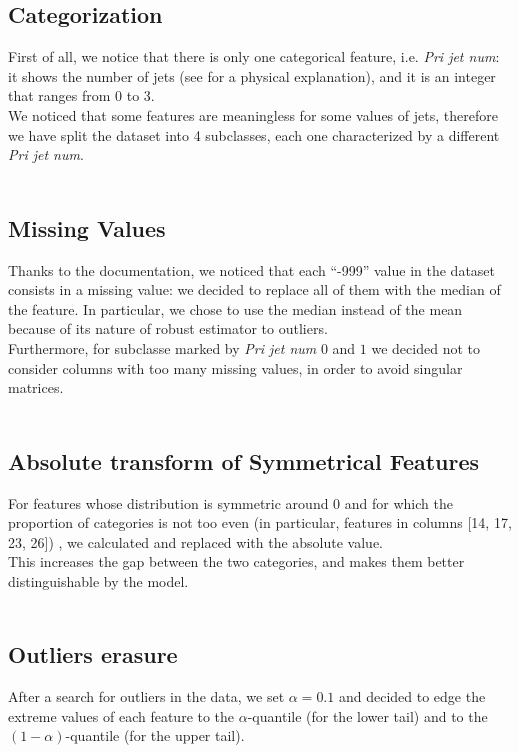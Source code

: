 \documentclass[10pt,conference,compsocconf]{IEEEtran}
\begin{document}
\subsection{Categorization}
First of all, we notice that there is only one categorical feature, i.e. \textit{Pri jet num}: it shows the number of jets (see \cite{higgs} for a physical explanation), and it is an integer that ranges from 0 to 3. \\
We noticed that some features are meaningless for some values of jets, therefore we have split the dataset into 4 subclasses, each one characterized by a different \textit{Pri jet num}.\\
\vspace{-0.8cm}\\

\subsection{Missing Values}
Thanks to the documentation, we noticed that each “-999” value
in the dataset consists in a missing value: we decided to replace all of them with the median of the feature. In particular, we chose to use the median instead of the mean because of its nature of robust estimator to outliers.\\
Furthermore, for subclasse marked by \textit{Pri jet num} $0$ and $1$ we decided not to consider columns with too many missing values, in order to avoid singular matrices.\\
\vspace{-0.8cm}\\

\subsection{Absolute transform of Symmetrical Features}
For features whose distribution is symmetric around 0 and
for which the proportion of categories is not too even (in particular, features in columns [14, 17, 23, 26]) , we calculated and replaced with the absolute value.\\
This increases the gap between the two categories, and makes them better distinguishable by the model. \\
\vspace{-0.8cm}\\

\subsection{Outliers erasure}
After a search for outliers in the data, we set $\alpha = 0.1$ and decided to edge the extreme values of each feature to the $\alpha$-quantile (for the lower tail) and to the $(1-\alpha)$-quantile (for the upper tail).\\
\vspace{-0.8cm}\\
\end{document}
